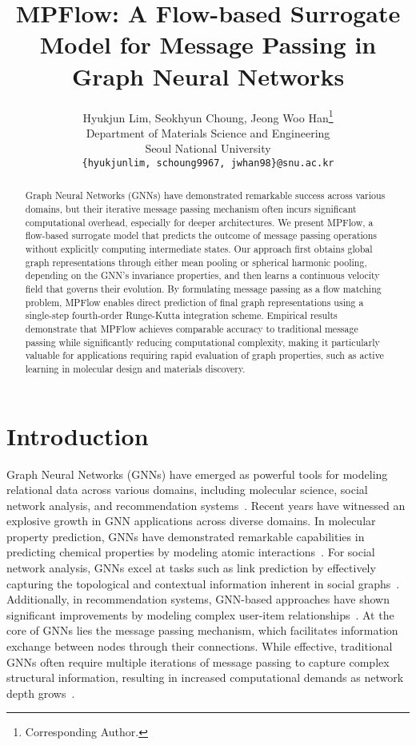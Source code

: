 \documentclass{article}
\title{MPFlow: A Flow-based Surrogate Model for Message Passing in Graph Neural Networks}
\author{
  Hyukjun Lim, Seokhyun Choung, Jeong Woo Han\thanks{Corresponding Author.} \\
  Department of Materials Science and Engineering \\
  Seoul National University \\
  \texttt{\{hyukjunlim, schoung9967, jwhan98\}@snu.ac.kr} \\
}
\begin{document}
\maketitle


\begin{abstract}
Graph Neural Networks (GNNs) have demonstrated remarkable success across various domains, but their iterative message passing mechanism often incurs significant computational overhead, especially for deeper architectures. 
We present MPFlow, a flow-based surrogate model that predicts the outcome of message passing operations without explicitly computing intermediate states. 
Our approach first obtains global graph representations through either mean pooling or spherical harmonic pooling, depending on the GNN's invariance properties, and then learns a continuous velocity field that governs their evolution. 
By formulating message passing as a flow matching problem, MPFlow enables direct prediction of final graph representations using a single-step fourth-order Runge-Kutta integration scheme. 
Empirical results demonstrate that MPFlow achieves comparable accuracy to traditional message passing while significantly reducing computational complexity, making it particularly valuable for applications requiring rapid evaluation of graph properties, such as active learning in molecular design and materials discovery.
\end{abstract}


\section{Introduction}

Graph Neural Networks (GNNs) have emerged as powerful tools for modeling relational data across various domains, including molecular science, social network analysis, and recommendation systems~\citep{zhou2020graph}. 
Recent years have witnessed an explosive growth in GNN applications across diverse domains. 
In molecular property prediction, GNNs have demonstrated remarkable capabilities in predicting chemical properties by modeling atomic interactions~\citep{you2018graph, lim2025cheapnet}. 
For social network analysis, GNNs excel at tasks such as link prediction by effectively capturing the topological and contextual information inherent in social graphs~\citep{zhang2018link}. 
Additionally, in recommendation systems, GNN-based approaches have shown significant improvements by modeling complex user-item relationships~\citep{fan2019graph}. 
At the core of GNNs lies the message passing mechanism, which facilitates information exchange between nodes through their connections. 
While effective, traditional GNNs often require multiple iterations of message passing to capture complex structural information, resulting in increased computational demands as network depth grows~\citep{gilmer2017neural, xu2018powerful}.
\end{document}
